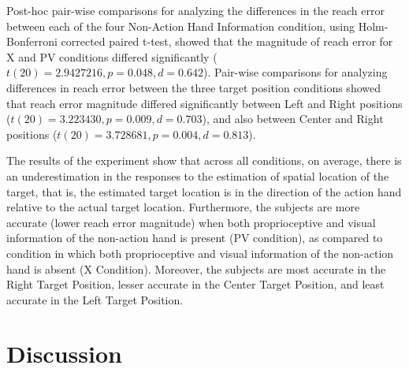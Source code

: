 
Post-hoc pair-wise comparisons for analyzing the differences in the reach error between each of the four Non-Action Hand Information condition, using Holm-Bonferroni corrected paired t-test, showed that the magnitude of reach error for X and PV conditions differed significantly ($t(20) = 2.9427216, p = 0.048, d = 0.642$). Pair-wise comparisons for analyzing differences in reach error between the three target position conditions showed that reach error magnitude differed significantly between Left and Right positions ($t(20) = 3.223430, p = 0.009, d = 0.703$), and also between Center and Right positions ($t(20) = 3.728681, p = 0.004, d = 0.813$).


The results of the experiment show that across all conditions, on average, there is an underestimation in the responses to the estimation of spatial location of the target, that is, the estimated target location is in the direction of the action hand relative to the actual target location. Furthermore, the subjects are more accurate (lower reach error magnitude) when both proprioceptive and visual information of the non-action hand is present (PV condition), as compared to condition in which both proprioceptive and visual information of the non-action hand is absent (X Condition). Moreover, the subjects are most accurate in the Right Target Position, lesser accurate in the Center Target Position, and least accurate in the Left Target Position. 

\section{Discussion}




